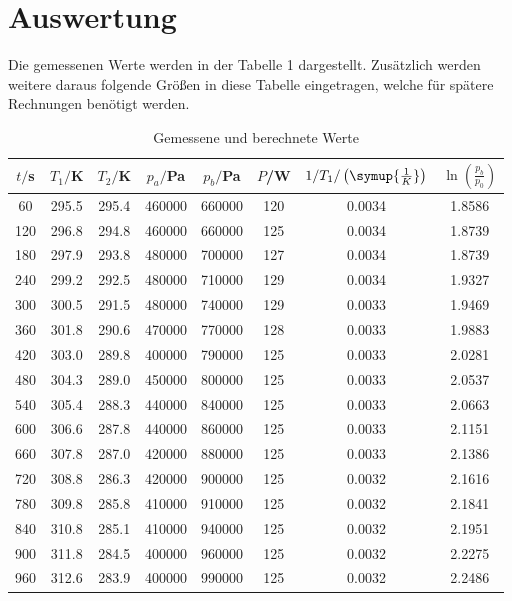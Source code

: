 \section{Auswertung}
\label{sec:Auswertung}

Die gemessenen Werte werden in der Tabelle  1 dargestellt. Zusätzlich werden weitere
daraus folgende Größen in diese Tabelle eingetragen, welche für spätere Rechnungen
benötigt werden.
\begin{table}[H]
  \centering
  \caption{Gemessene und berechnete Werte}
  \label{tab:Werte}
  \begin{tabular}{c c c c c c c c}
    \toprule
    $t/$s & $T_1/$K & $T_2/$K & $p_a/$Pa & $p_b/$Pa & $P$/W & $1/T_1/\left(\symup{\frac{1}{K}}\right)$ & $\ln\left(\frac{p_b}{p_0}\right)$ \\
    \midrule
      60  &  295.5 &  295.4 & 460000  &  660000 & 120 & 0.0034 & 1.8586 \\
     120  &  296.8 &  294.8 & 460000  &  660000 & 125 & 0.0034 & 1.8739 \\
     180  &  297.9 &  293.8 & 480000  &  700000 & 127 & 0.0034 & 1.8739 \\
     240  &  299.2 &  292.5 & 480000  &  710000 & 129 & 0.0034 & 1.9327 \\
     300  &  300.5 &  291.5 & 480000  &  740000 & 129 & 0.0033 & 1.9469 \\
     360  &  301.8 &  290.6 & 470000  &  770000 & 128 & 0.0033 & 1.9883 \\
     420  &  303.0 &  289.8 & 400000  &  790000 & 125 & 0.0033 & 2.0281 \\
     480  &  304.3 &  289.0 & 450000  &  800000 & 125 & 0.0033 & 2.0537 \\
     540  &  305.4 &  288.3 & 440000  &  840000 & 125 & 0.0033 & 2.0663 \\
     600  &  306.6 &  287.8 & 440000  &  860000 & 125 & 0.0033 & 2.1151 \\
     660  &  307.8 &  287.0 & 420000  &  880000 & 125 & 0.0033 & 2.1386 \\
     720  &  308.8 &  286.3 & 420000  &  900000 & 125 & 0.0032 & 2.1616 \\
     780  &  309.8 &  285.8 & 410000  &  910000 & 125 & 0.0032 & 2.1841 \\
     840  &  310.8 &  285.1 & 410000  &  940000 & 125 & 0.0032 & 2.1951 \\
     900  &  311.8 &  284.5 & 400000  &  960000 & 125 & 0.0032 & 2.2275 \\
     960  &  312.6 &  283.9 & 400000  &  990000 & 125 & 0.0032 & 2.2486 \\

\end{tabular}
\end{table}
